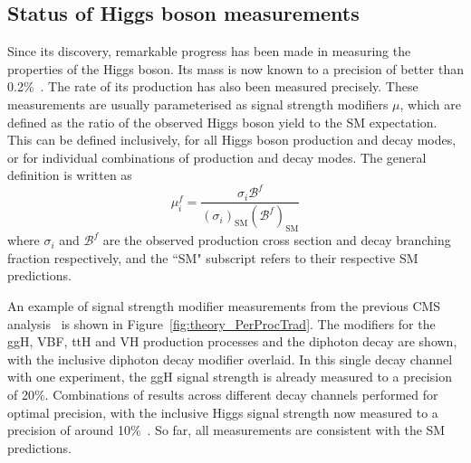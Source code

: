 \subsection{Status of Higgs boson measurements}

Since its discovery, remarkable progress has been made 
in measuring the properties of the Higgs boson.
Its mass is now known to a precision of better than 0.2\%~\cite{HIG-16-041}.
The rate of its production has also been measured precisely.
These measurements are usually parameterised as signal strength modifiers $\mu$,
which are defined as the ratio of the observed Higgs boson yield to the SM expectation.
This can be defined inclusively, for all Higgs boson production and decay modes, 
or for individual combinations of production and decay modes.
The general definition is written as
\begin{equation}
\mu^f_i = \frac{\sigma_i\mathcal{B}^f}{(\sigma_i)_{\textrm{SM}}(\mathcal{B}^f)_{\textrm{SM}}}
\end{equation}
where $\sigma_i$ and $\mathcal{B}^f$ are the observed production cross section 
and decay branching fraction respectively, 
and the ``SM" subscript refers to their respective SM predictions.

An example of signal strength modifier measurements 
from the previous CMS \Hgg analysis~\cite{HIG-16-040} is shown in Figure~\ref{fig:theory_PerProcTrad}.
The modifiers for the ggH, VBF, ttH and VH production processes and the diphoton decay are shown, 
with the inclusive diphoton decay modifier overlaid.
In this single decay channel with one experiment, 
the ggH signal strength is already measured to a precision of 20\%.
Combinations of results across different decay channels performed for optimal precision,
with the inclusive Higgs signal strength now measured 
to a precision of around 10\%~\cite{ATLAScomb,CMScomb}.
So far, all measurements are consistent with the SM predictions.

